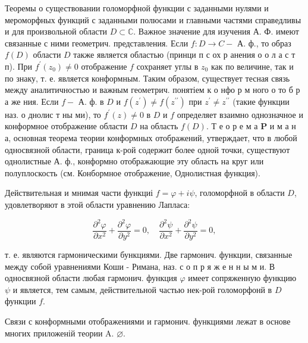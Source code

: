 \documentclass[10pt]{article}
\begin{document}
Теоремы о существовании голоморфной функции с заданными нулями и мероморфных функций с заданными полюсами и главными частями справедливы и для произвольной области $D \subset \mathbb{C}$. Важное значение для изучения А. Ф. имеют связанные с ними геометрич. представления. Если $f: D \rightarrow C-$ А. ф., то образ $f(D)$ области $D$ также является областью (принци п с ох р анения о о л а с т п). При $f^{\prime}\left(z_{0}\right) \neq 0$ отображение $f$ сохраняет углы в $z_{0}$ как по величине, так и по знаку, т. е. является конформным. Таким образом, существует тесная связь между аналитичностью и важным геометрич. понятіем к о нфо р м ного о то б р а же ния. Если $f-$ А. ф. в $D$ и $f\left(z^{\prime}\right) \neq f\left(z^{\prime \prime}\right)$ при $z^{\prime} \neq z^{\prime \prime}$ (такие функции наз. о днолис т ны ми), то $f^{\prime}(z) \neq 0$ в $D$ и $f$ определяет взаимно однозначное и конформное отображение области $D$ на область $f(D)$. Т е о р е м а $\mathbf{P}$ и м а н а, основная теорема теории конформных отображений, утверждает, что в любой односвязной области, граница к-рой содержит более одной точки, существуют однолистные А. ф., конформно отображающие эту область на круг или полуплоскость (см. Конбормное отображение, Однолистная функция).



Действительная и мнимая части функциі $f=\varphi+i \psi$, голоморфной в области $D$, удовлетворяют в этой области уравнению Лапласа:



\[

\frac{\partial^{2} \varphi}{\partial x^{2}}+\frac{\partial^{2} \varphi}{\partial y^{2}}=0, \quad \frac{\partial^{2} \psi}{\partial x^{2}}+\frac{\partial^{2} \psi}{\partial y^{2}}=0,

\]



т. е. являются гармоническими бункциями. Две гармонич. функции, связанные между собой уравнениями Коши - Римана, наз. с о п р я ж е н н ы м и. В односвязной области любая гармонич. функция $\varphi$ имеет сопряженную функцию $\psi$ и является, тем самым, действительной частью нек-рой голоморфонй в $D$ функции $f$.



Связи с конформными отображениями и гармонич. функциями лежат в основе многих приложеній теории A. $\varnothing$.
\end{document}
